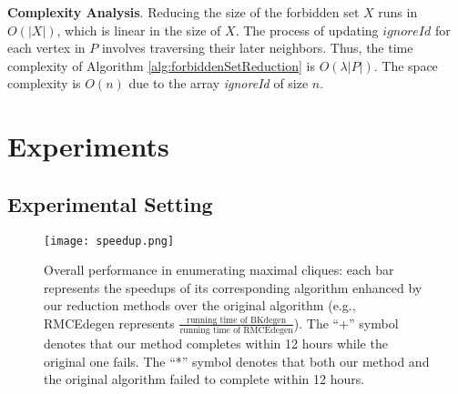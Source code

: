 \documentclass[sigconf, nonacm]{acmart}
\begin{document}
\noindent \textbf{Complexity Analysis}.  Reducing the size of the forbidden set $X$ runs in $O(\lvert X\rvert)$, which is linear in the size of $X$. The process of updating  $ignoreId$ for each vertex in $P$ involves traversing their later neighbors. Thus, the time complexity of Algorithm \ref{alg:forbiddenSetReduction} is $O(\lambda\lvert P\rvert)$.
The space complexity %
is $O(n)$ due to the array \textit{ignoreId} of size $n$.


\section{Experiments} \label{sec7}

\subsection{Experimental Setting}

\begin{figure*}[tbp]\vspace{-0.1in}
\centerline{\texttt{[image: speedup.png]}}
\vspace{-0.1in}
\caption{Overall performance in enumerating maximal cliques:  each bar represents the speedups of its corresponding algorithm enhanced by our reduction methods over the original algorithm (e.g., RMCEdegen represents $\frac{\text{running time of BKdegen}}{\text{running time of RMCEdegen}}$).
The ``+'' symbol denotes that our method completes within 12 hours while the original one fails. 
The ``*'' symbol denotes that both our method and the original algorithm failed to complete within 12 hours.}
\label{speedup}
\end{figure*}
\end{document}
